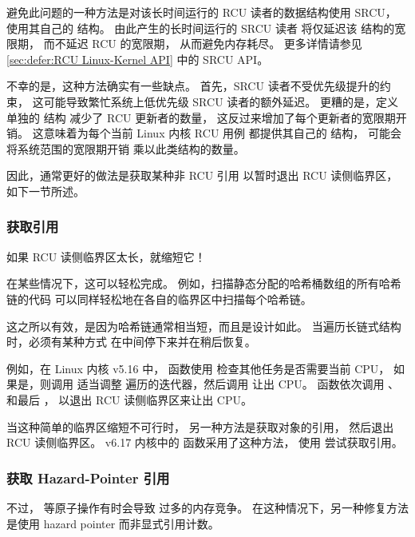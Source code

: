 避免此问题的一种方法是对该长时间运行的
RCU 读者的数据结构使用 SRCU，
使用其自己的  结构。
由此产生的长时间运行的 SRCU 读者
将仅延迟该  结构的宽限期，
而不延迟 RCU 的宽限期，
从而避免内存耗尽。
更多详情请参见 \cref{sec:defer:RCU Linux-Kernel API} 中的 SRCU API。

不幸的是，这种方法确实有一些缺点。
首先，SRCU 读者不受优先级提升的约束，
这可能导致繁忙系统上低优先级 SRCU 读者的额外延迟。
更糟的是，定义单独的  结构
减少了 RCU 更新者的数量，
这反过来增加了每个更新者的宽限期开销。
这意味着为每个当前 Linux 内核 RCU 用例
都提供其自己的  结构，
可能会将系统范围的宽限期开销
乘以此类结构的数量。

因此，通常更好的做法是获取某种非 RCU 引用
以暂时退出 RCU 读侧临界区，
如下一节所述。

\subsubsection{获取引用}
\label{sec:together:Acquire a Reference}

如果 RCU 读侧临界区太长，就缩短它！

在某些情况下，这可以轻松完成。
例如，扫描静态分配的哈希桶数组的所有哈希链的代码
可以同样轻松地在各自的临界区中扫描每个哈希链。

这之所以有效，是因为哈希链通常相当短，而且是设计如此。
当遍历长链式结构时，必须有某种方式
在中间停下来并在稍后恢复。

例如，在 Linux 内核 v5.16 中，
 函数使用 
检查其他任务是否需要当前 CPU，
如果是，则调用  适当调整
遍历的迭代器，然后调用 
让出 CPU\@。
 函数依次调用 、
 和最后 ，
以退出 RCU 读侧临界区来让出 CPU。

当这种简单的临界区缩短不可行时，
另一种方法是获取对象的引用，
然后退出 RCU 读侧临界区。
v6.17 内核中的  函数采用了这种方法，
使用  尝试获取引用。

\subsubsection{获取 Hazard-Pointer 引用}
\label{sec:together:Acquire a Hazard-Pointer Reference}

不过， 等原子操作有时会导致
过多的内存竞争。
在这种情况下，另一种修复方法是使用 hazard pointer
而非显式引用计数。

